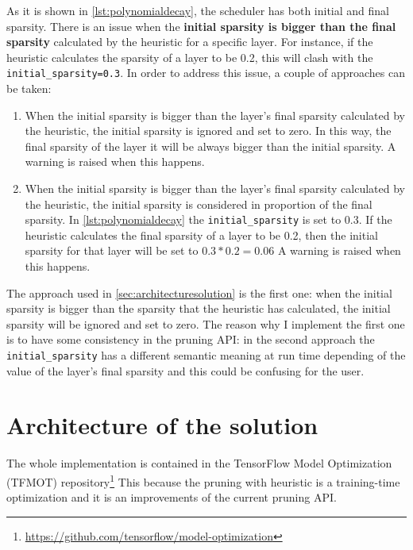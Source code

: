 As it is shown in \autoref{lst:polynomialdecay}, the scheduler has both initial
and final sparsity.
There is an issue when the \textbf{initial sparsity is bigger than the final
sparsity} calculated by the heuristic for a specific layer.
For instance, if the heuristic calculates the sparsity of a layer to be 0.2,
this will clash with the \texttt{initial\_sparsity=0.3}.
In order to address this issue, a couple of approaches can be taken:

\begin{enumerate}
    \item When the initial sparsity is bigger than the layer's final sparsity
        calculated by the heuristic, the initial sparsity is ignored and set to
        zero. In this way, the final sparsity of the layer it will be always
        bigger than the initial sparsity. A warning is raised when this
        happens.
    \item When the initial sparsity is bigger than the layer's final sparsity
        calculated by the heuristic, the initial sparsity is considered in
        proportion of the final sparsity. In \autoref{lst:polynomialdecay} the
        \texttt{initial\_sparsity} is set to 0.3. If the heuristic calculates
        the final sparsity of a layer to be 0.2, then the initial sparsity for
        that layer will be set to $0.3 * 0.2 = 0.06$
        A warning is raised when this happens.
\end{enumerate}

The approach used in \autoref{sec:architecturesolution} is the first one: when
the initial sparsity is bigger than the sparsity that the heuristic has
calculated, the initial sparsity will be ignored and set to zero.
The reason why I implement the first one is to have some consistency in the
pruning API\@: in the second approach the \texttt{initial\_sparsity} has a
different semantic meaning at run time depending of the value of the layer's
final sparsity and this could be confusing for the user.

\section{Architecture of the solution}\label{sec:architecturesolution}
The whole implementation is contained in the TensorFlow Model Optimization
(TFMOT)
repository\footnote{\url{https://github.com/tensorflow/model-optimization}}
This because the pruning with heuristic is a training-time optimization and it
is an improvements of the current pruning API\@.

